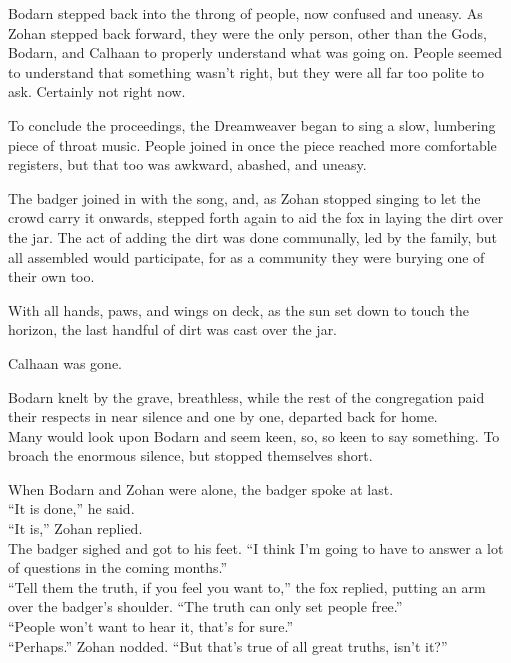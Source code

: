 Bodarn stepped back into the throng of people, now confused and uneasy. As Zohan stepped back forward, they were the only person, other than the Gods, Bodarn, and Calhaan to properly understand what was going on. People seemed to understand that something wasn't right, but they were all far too polite to ask. Certainly not right now.

To conclude the proceedings, the Dreamweaver began to sing a slow, lumbering piece of throat music. People joined in once the piece reached more comfortable registers, but that too was awkward, abashed, and uneasy.

The badger joined in with the song, and, as Zohan stopped singing to let the crowd carry it onwards, stepped forth again to aid the fox in laying the dirt over the jar. The act of adding the dirt was done communally, led by the family, but all assembled would participate, for as a community they were burying one of their own too.

With all hands, paws, and wings on deck, as the sun set down to touch the horizon, the last handful of dirt was cast over the jar.

Calhaan was gone.

Bodarn knelt by the grave, breathless, while the rest of the congregation paid their respects in near silence and one by one, departed back for home.\\
Many would look upon Bodarn and seem keen, so, so keen to say something. To broach the enormous silence, but stopped themselves short.

When Bodarn and Zohan were alone, the badger spoke at last.\\
``It is done,'' he said.\\
``It is,'' Zohan replied.\\
The badger sighed and got to his feet. ``I think I'm going to have to answer a lot of questions in the coming months.''\\
``Tell them the truth, if you feel you want to,'' the fox replied, putting an arm over the badger's shoulder. ``The truth can only set people free.''\\
``People won't want to hear it, that's for sure.''\\
``Perhaps.'' Zohan nodded. ``But that's true of all great truths, isn't it?''
